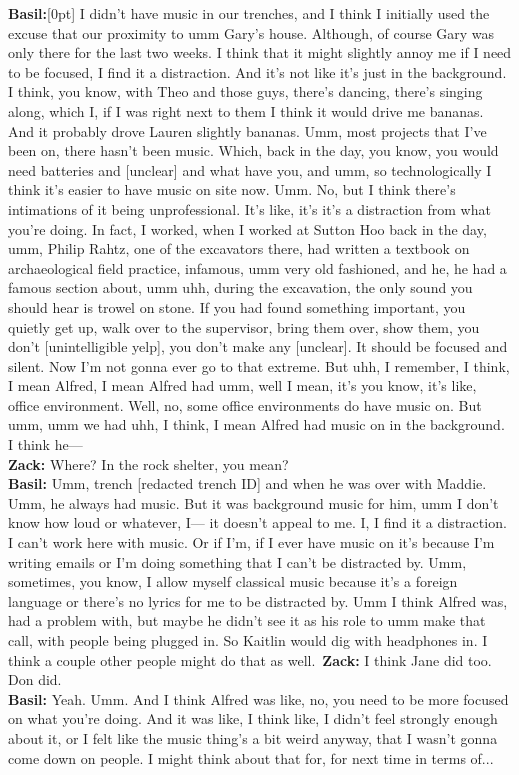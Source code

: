 \documentclass[
]{article}
\newcommand{\paragraphnumber}[1]{\marginnote{\color{lightgray}\tiny{#1}}[0pt]}
\begin{document}
\textbf{Basil:}\paragraphnumber{[60]} I didn't have music in our
trenches, and I think I initially used the excuse that our proximity to
umm Gary's house. Although, of course Gary was only there for the last
two weeks. I think that it might slightly annoy me if I need to be
focused, I find it a distraction. And it's not like it's just in the
background. I think, you know, with Theo and those guys, there's
dancing, there's singing along, which I, if I was right next to them I
think it would drive me bananas. And it probably drove Lauren slightly
bananas. Umm, most projects that I've been on, there hasn't been music.
Which, back in the day, you know, you would need batteries and
{[}unclear{]} and what have you, and umm, so technologically I think
it's easier to have music on site now. Umm. No, but I think there's
intimations of it being unprofessional. It's like, it's it's a
distraction from what you're doing. In fact, I worked, when I worked at
Sutton Hoo back in the day, umm, Philip Rahtz, one of the excavators
there, had written a textbook on archaeological field practice,
infamous, umm very old fashioned, and he, he had a famous section about,
umm uhh, during the excavation, the only sound you should hear is trowel
on stone. If you had found something important, you quietly get up, walk
over to the supervisor, bring them over, show them, you don't
{[}unintelligible yelp{]}, you don't make any {[}unclear{]}. It should
be focused and silent. Now I'm not gonna ever go to that extreme. But
uhh, I remember, I think, I mean Alfred, I mean Alfred had umm, well I
mean, it's you know, it's like, office environment. Well, no, some
office environments do have music on. But umm, umm we had uhh, I think,
I mean Alfred had music on in the background. I think he---\\
\textbf{Zack:} Where? In the rock shelter, you mean?\\
\textbf{Basil:} Umm, trench {[}redacted trench ID{]} and when he was
over with Maddie. Umm, he always had music. But it was background music
for him, umm I don't know how loud or whatever, I--- it doesn't appeal
to me. I, I find it a distraction. I can't work here with music. Or if
I'm, if I ever have music on it's because I'm writing emails or I'm
doing something that I can't be distracted by. Umm, sometimes, you know,
I allow myself classical music because it's a foreign language or
there's no lyrics for me to be distracted by. Umm I think Alfred was,
had a problem with, but maybe he didn't see it as his role to umm make
that call, with people being plugged in. So Kaitlin would dig with
headphones in. I think a couple other people might do that as
well.~\textbf{Zack:} I think Jane did too. Don did.\\
\textbf{Basil:} Yeah. Umm. And I think Alfred was like, no, you need to
be more focused on what you're doing. And it was like, I think like, I
didn't feel strongly enough about it, or I felt like the music thing's a
bit weird anyway, that I wasn't gonna come down on people. I might think
about that for, for next time in terms of...
\end{document}
